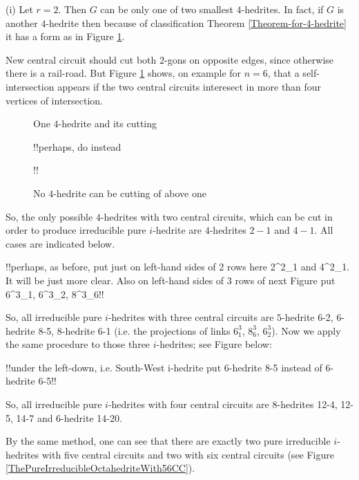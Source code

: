 \documentclass[12pt]{article}
\begin{document}
(i) Let $r=2$. Then $G$ can be only one of two smallest $4$-hedrites. In 
fact, if $G$ is another $4$-hedrite then because of classification Theorem 
\ref{Theorem-for-4-hedrite} it has a form as in Figure \ref{Cutting4hedrite}.

New central circuit should cut both $2$-gons on opposite edges, since otherwise there is a rail-road. But Figure \ref{Cutting4hedrite} shows, on example for $n=6$, that a self-intersection appears if the two central circuits interesect in more than four vertices of intersection.


\begin{figure}
\centering
\epsfxsize=40mm
\caption{One $4$-hedrite and its cutting}
!!perhaps, do instead 
\caption{No $4$-hedrite can be cutting of above one}!!
\label{Cutting4hedrite}
\end{figure}



So, the only possible $4$-hedrites with two central circuits, which can
be cut in order to produce irreducible pure $i$-hedrite
are $4$-hedrites $2-1$ and $4-1$. 
All cases are indicated below. 

\begin{center}
\epsfxsize=120mm
\end{center}
!!perhaps, as before, put just on left-hand sides of 2 rows here
2^2_1 and 4^2_1.
It will be just more clear. Also on left-hand sides of 3 rows of next
Figure 
put 6^3_1, 6^3_2, 8^3_6!!



So, all irreducible pure $i$-hedrites with three central circuits are $5$-hedrite 6-2, $6$-hedrite 8-5, $8$-hedrite 6-1 (i.e. the projections of links $6^3_1$, $8^3_6$, $6^3_2$).
Now we apply the same procedure to those three $i$-hedrites; see Figure below:

\begin{center}
\epsfxsize=120mm
\end{center}
!!under the left-down, i.e. South-West i-hedrite 
put  6-hedrite 8-5  instead of   6-hedrite 6-5!!


So, all irreducible pure $i$-hedrites with four central circuits are $8$-hedrites 12-4, 12-5, 14-7 and $6$-hedrite 14-20.

By the same method, one can see that there are exactly two pure irreducible $i$-hedrites with five central circuits and two with six central circuits (see Figure \ref{ThePureIrreducibleOctahedriteWith56CC}).
\end{document}
